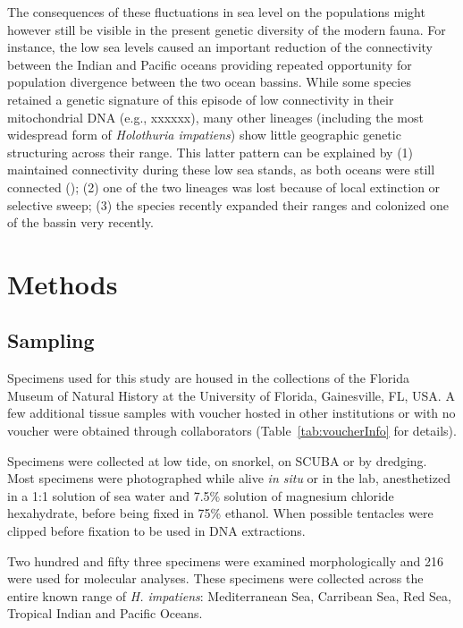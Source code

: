 \documentclass{article}\usepackage[]{graphicx}\usepackage[]{color}
\begin{document}
The consequences of these fluctuations in sea level on the populations might
however still be visible in the present genetic diversity of the modern
fauna. For instance, the low sea levels caused an important reduction of the
connectivity between the Indian and Pacific oceans providing repeated
opportunity for population divergence between the two ocean bassins. While some
species retained a genetic signature of this episode of low connectivity in
their mitochondrial DNA (e.g., xxxxxx), many other lineages (including the most
widespread form of \textit{Holothuria impatiens}) show little geographic genetic
structuring across their range. This latter pattern can be explained by (1)
maintained connectivity during these low sea stands, as both oceans were still
connected (\cite{Voris2000}); (2) one of the two lineages was lost because of
local extinction or selective sweep; (3) the species recently expanded their
ranges and colonized one of the bassin very recently.




\section{Methods}

\subsection{Sampling}

Specimens used for this study are housed in the collections of the Florida
Museum of Natural History at the University of Florida, Gainesville, FL, USA. A
few additional tissue samples with voucher hosted in other institutions or with
no voucher were obtained through collaborators (Table~\ref{tab:voucherInfo} for
details).

Specimens were collected at low tide, on snorkel, on SCUBA or by dredging. Most
specimens were photographed while alive \textit{in situ} or in the lab,
anesthetized in a 1:1 solution of sea water and 7.5\% solution of magnesium
chloride hexahydrate, before being fixed in 75\% ethanol. When possible
tentacles were clipped before fixation to be used in DNA extractions.

Two hundred and fifty three specimens were examined morphologically and 216 were
used for molecular analyses. These specimens were collected across the entire
known range of \textit{H. impatiens}: Mediterranean Sea, Carribean Sea, Red Sea,
Tropical Indian and Pacific Oceans.
\end{document}
